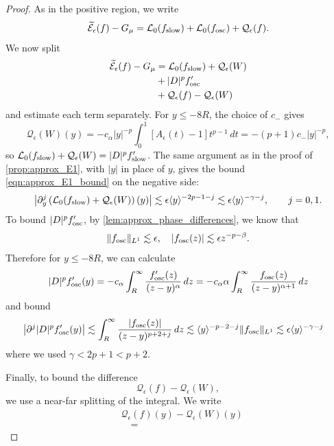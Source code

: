 \documentclass[11pt]{amsart}
\theoremstyle{definition}
\theoremstyle{remark}
\numberwithin{equation}{section}
\newcommand{\sq}[1]{\widetilde{#1}}
\newcommand{\mc}[1]{\mathcal{#1}}
\newcommand{\ang}[1]{\langle #1 \rangle}
\begin{document}
\begin{proof}
    As in the positive region, we write
    \[\sq{\mc{E}}_\epsilon(f)-G_\mu = \mc{L}_0(f_{\textup{slow}}) + \mc{L}_0(f_{\textup{osc}}) + \mc{Q}_\epsilon(f).\]
    We now split
    \begin{align*}
        \sq{\mc{E}}_\epsilon(f)-G_\mu & = \mc{L}_0(f_{\textup{slow}}) + \mc{Q}_\epsilon(W) \\
        & + |D|^p f_{\textup{osc}}' \\
        & + \mc{Q}_\epsilon(f) - \mc{Q}_\epsilon(W)
    \end{align*}
    and estimate each term separately. For $y\leq-8R$, the choice of $c_-$ gives
    \[
        \mc{Q}_\epsilon(W)(y)
        =-c_\alpha|y|^{-p}\int_0^1[A_\epsilon(t)-1]t^{p-1}\,dt
        =-(p+1)c_-|y|^{-p},
    \]
    so $\mc{L}_0(f_{\textup{slow}})+\mc{Q}_\epsilon(W)=|D|^pf_{\textup{slow}}'$. The same argument as in the proof of \cref{prop:approx_E1}, with $|y|$ in place of $y$, gives the bound \eqref{eqn:approx_E1_bound} on the negative side:
    \[
        \left|\partial_y^j\left(\mc{L}_0(f_{\textup{slow}})+\mc{Q}_\epsilon(W)\right)(y)\right|
        \lesssim\epsilon\ang{y}^{-2p-1-j}
        \lesssim\epsilon\ang{y}^{-\gamma-j},\qquad j=0,1.
    \]
    To bound $|D|^p f_{\textup{osc}}'$, by \cref{lem:approx_phase_differences}, we know that 
    \[\|f_{\textup{osc}}\|_{L^1} \lesssim \epsilon, \quad |f_{\textup{osc}}(z)| \lesssim \epsilon z^{-p - \beta}. \]
    Therefore for $y \leq -8R$, we can calculate
    \[|D|^p f_{\textup{osc}}'(y) = -c_\alpha \int_{R}^{\infty}\frac{f_{\textup{osc}}'(z)}{(z - y)^\alpha} \, dz = -c_\alpha\alpha \int_{R}^{\infty}\frac{f_{\textup{osc}}(z)}{(z - y)^{\alpha+1}} \, dz\]
    and bound
    \begin{align*}
        \left|\partial^j|D|^p f_{\textup{osc}}'(y)\right|
        &\lesssim\int_R^\infty\frac{|f_{\textup{osc}}(z)|}{(z-y)^{p+2 + j}}\,dz
        \lesssim\ang{y}^{-p-2 - j}\|f_{\textup{osc}}\|_{L^1}
        \lesssim\epsilon\ang{y}^{-\gamma - j}
    \end{align*}
    where we used $\gamma<2p+1<p+2$. \par
    Finally, to bound the difference 
    \[\mc{Q}_\epsilon(f) - \mc{Q}_\epsilon(W),\]
    we use a near-far splitting of the integral. We write
    \begin{equation}\label{eqn:approx_negative_Q_split}
    \begin{aligned}
        &\mc{Q}_\epsilon(f)(y)-\mc{Q}_\epsilon(W)(y)\\
        &\quad=

\end{aligned}
\end{equation}
\end{proof}
\end{document}
